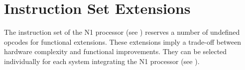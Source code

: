
\section{Instruction Set Extensions}
\label{extensions}

The instruction set of the N1 processor (see ) reserves a number
of undefined \glspl{opcode} for functional extensions.
These extensions imply a trade-off between hardware complexity and functional 
improvements.
They can be selected individually for each system integrating the N1 processor
(see ).    

